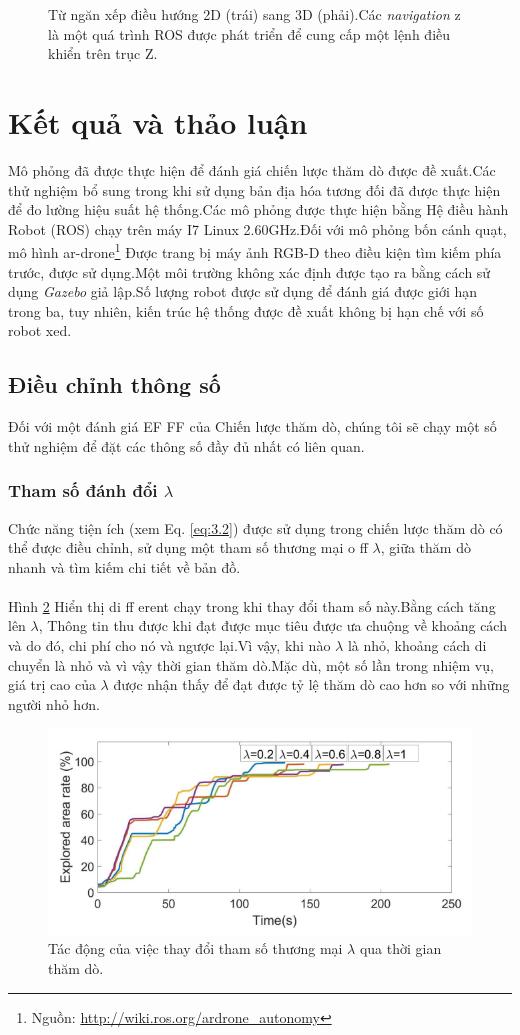 \documentclass[11pt,openany]{book}
\begin{document}
\begin{algorimth}[H]
\begin{figure}[H]
    \caption{Từ ngăn xếp điều hướng 2D (trái) sang 3D (phải).Các \textit{navigation} z là một quá trình ROS được phát triển để cung cấp một lệnh điều khiển trên trục Z.}
    \label{fig:3.10}
\end{figure}
\section{Kết quả và thảo luận}
Mô phỏng đã được thực hiện để đánh giá chiến lược thăm dò được đề xuất.Các thử nghiệm bổ sung trong khi sử dụng bản địa hóa tương đối đã được thực hiện để đo lường hiệu suất hệ thống.Các mô phỏng được thực hiện bằng Hệ điều hành Robot (ROS) chạy trên máy I7 Linux 2.60GHz.Đối với mô phỏng bốn cánh quạt, mô hình ar-drone\footnote{Nguồn: \url{http://wiki.ros.org/ardrone_autonomy}} Được trang bị máy ảnh RGB-D theo điều kiện tìm kiếm phía trước, được sử dụng.Một môi trường không xác định được tạo ra bằng cách sử dụng \textit{Gazebo} giả lập.Số lượng robot được sử dụng để đánh giá được giới hạn trong ba, tuy nhiên, kiến trúc hệ thống được đề xuất không bị hạn chế với số robot xed.
\subsection{Điều chỉnh thông số}
Đối với một đánh giá EF FF của Chiến lược thăm dò, chúng tôi sẽ chạy một số thử nghiệm để đặt các thông số đầy đủ nhất có liên quan.
\subsubsection{Tham số đánh đổi $\lambda$}
Chức năng tiện ích (xem Eq. \ref{eq:3.2}) được sử dụng trong chiến lược thăm dò có thể được điều chỉnh, sử dụng một tham số thương mại o ff $\lambda$, giữa thăm dò nhanh và tìm kiếm chi tiết về bản đồ.\\\\
Hình \ref{fig:3.11} Hiển thị di ff erent chạy trong khi thay đổi tham số này.Bằng cách tăng lên $\lambda$, Thông tin thu được khi đạt được mục tiêu được ưa chuộng về khoảng cách và do đó, chi phí cho nó và ngược lại.Vì vậy, khi nào $\lambda$ là nhỏ, khoảng cách di chuyển là nhỏ và vì vậy thời gian thăm dò.Mặc dù, một số lần trong nhiệm vụ, giá trị cao của $\lambda$ được nhận thấy để đạt được tỷ lệ thăm dò cao hơn so với những người nhỏ hơn.
\begin{figure}[H]
    \centering
    \includegraphics[scale=0.5]{assets/3_11.png}
    \caption{Tác động của việc thay đổi tham số thương mại $\lambda$ qua thời gian thăm dò.}
    \label{fig:3.11}
\end{figure}

\end{algorimth}
\end{document}
